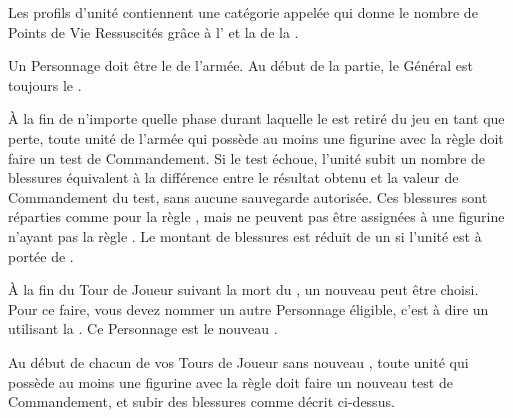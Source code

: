 
\newcommand{\QRSnote}{%
\noindent$^{1}$ En Monture, le Personnage remplace le \cadavermaster{}.

\noindent$^{2}$ En Monture, le Personnage remplace une \paramour{}.
}













\startarmywiderules

\armywideruleentry{\invocation}

Les profils d'unité contiennent une catégorie appelée \invocation{} qui donne le nombre de Points de Vie Ressuscités grâce à l'\necromancysignature{} et la \necromancyspellfour{} de la \Pathof{} \necromancy{}.

\armywideruleentry{\masterofundeath}

Un Personnage doit être le \textbf{\master{}} de l'armée. Au début de la partie, le Général est toujours le \master{}.

\closearmywiderules

\vspace*{1.5cm}
\startarmyspecialrules

\armyspecialruleentry{\ashestoashes}

À la fin de n'importe quelle phase durant laquelle le \master{} est retiré du jeu en tant que perte, toute unité de l'armée qui possède au moins une figurine avec la règle \ashestoashes{} doit faire un test de Commandement. Si le test échoue, l'unité subit un nombre de blessures équivalent à la différence entre le résultat obtenu et la valeur de Commandement du test, sans aucune sauvegarde autorisée. Ces blessures sont réparties comme pour la règle \unstable{}, mais ne peuvent pas être assignées à une figurine n'ayant pas la règle \ashestoashes{}. Le montant de blessures est réduit de un si l'unité est à portée de \holdyourground{}.

\vspace*{5pt}À la fin du Tour de Joueur suivant la mort du \master{}, un nouveau \master{} peut être choisi. Pour ce faire, vous devez nommer un autre Personnage éligible, c'est à dire un \wizard{} utilisant la \Pathof{} \necromancy{}. Ce Personnage est le nouveau \master{}.

\vspace*{5pt}Au début de chacun de vos Tours de Joueur sans nouveau \master{}, toute unité qui possède au moins une figurine avec la règle \ashestoashes{} doit faire un nouveau test de Commandement, et subir des blessures comme décrit ci-dessus.

